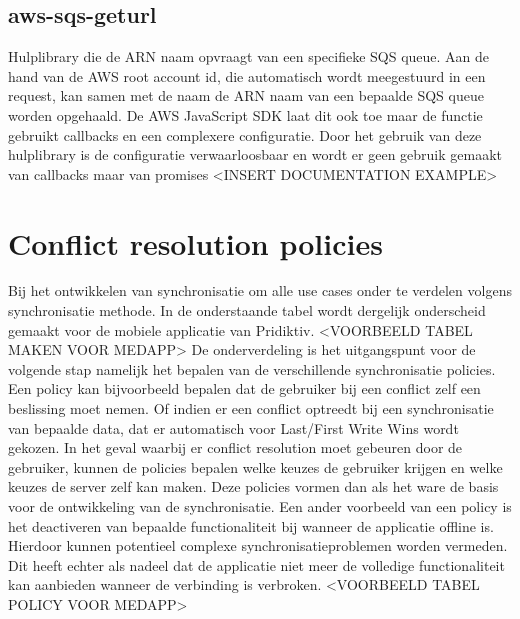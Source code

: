 \subsection{aws-sqs-geturl}
Hulplibrary die de ARN naam opvraagt van een specifieke SQS queue. Aan de hand van de AWS root account id, die automatisch wordt meegestuurd in een request, kan samen met de naam de ARN naam van een bepaalde SQS queue worden opgehaald. De AWS JavaScript SDK laat dit ook toe maar de functie gebruikt callbacks en een complexere configuratie. Door het gebruik van deze hulplibrary is de configuratie verwaarloosbaar en wordt er geen gebruik gemaakt van callbacks maar van promises
<INSERT DOCUMENTATION EXAMPLE>
\section{Conflict resolution policies}
Bij het ontwikkelen van synchronisatie om alle use cases onder te verdelen volgens synchronisatie methode. In de onderstaande tabel wordt dergelijk onderscheid gemaakt voor de mobiele applicatie van Pridiktiv.
<VOORBEELD TABEL MAKEN VOOR MEDAPP>
De onderverdeling is het uitgangspunt voor de volgende stap namelijk het bepalen van de verschillende synchronisatie policies. Een policy kan bijvoorbeeld bepalen dat de gebruiker bij een conflict zelf een beslissing moet nemen. Of indien er een conflict optreedt bij een synchronisatie van bepaalde data, dat er automatisch voor Last/First Write Wins wordt gekozen. In het geval waarbij er conflict resolution moet gebeuren door de gebruiker, kunnen de policies bepalen welke keuzes de gebruiker krijgen en welke keuzes de server zelf kan maken. Deze policies vormen dan als het ware de basis voor de ontwikkeling van de synchronisatie. Een ander voorbeeld van een policy is het deactiveren van bepaalde functionaliteit bij wanneer de applicatie offline is. Hierdoor kunnen potentieel complexe synchronisatieproblemen worden vermeden. Dit heeft echter als nadeel dat de applicatie niet meer de volledige functionaliteit kan aanbieden wanneer de verbinding is verbroken.
<VOORBEELD TABEL POLICY VOOR MEDAPP>
